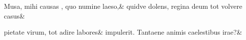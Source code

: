 \documentclass{article}
\begin{document}
\begin{pairs}
\begin{Rightside}
\vspace{10pt}

\begin{stanza}
Musa, mihi causas , quo numine laeso,&
quidve dolens, regina deum tot volvere casus\&
\end{stanza}

\vspace{10pt}

\begin{stanza}
 pietate virum, tot adire labores&
impulerit. Tantaene animis caelestibus irae?\&
\end{stanza}

\endnumbering

\end{Rightside}

\end{pairs}
\Columns
\end{document}
